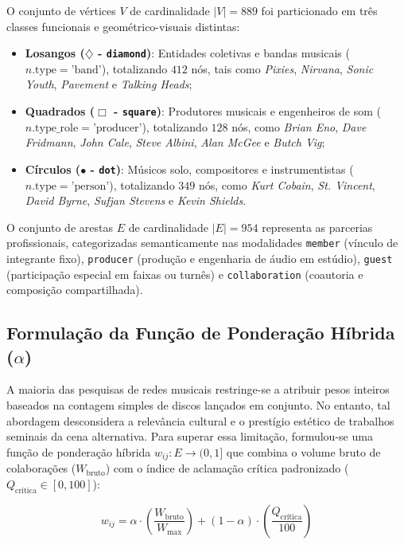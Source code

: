 \documentclass[conference]{IEEEtran}
\begin{document}
O conjunto de vértices $V$ de cardinalidade $|V|=889$ foi particionado em três classes funcionais e geométrico-visuais distintas:
\begin{itemize}
    \item \textbf{Losangos ($\diamondsuit$ - \texttt{diamond})}: Entidades coletivas e bandas musicais ($n.\text{type} = \text{'band'}$), totalizando $412$ nós, tais como \textit{Pixies}, \textit{Nirvana}, \textit{Sonic Youth}, \textit{Pavement} e \textit{Talking Heads};
    \item \textbf{Quadrados ($\Box$ - \texttt{square})}: Produtores musicais e engenheiros de som ($n.\text{type\_role} = \text{'producer'}$), totalizando $128$ nós, como \textit{Brian Eno}, \textit{Dave Fridmann}, \textit{John Cale}, \textit{Steve Albini}, \textit{Alan McGee} e \textit{Butch Vig};
    \item \textbf{Círculos ($\bullet$ - \texttt{dot})}: Músicos solo, compositores e instrumentistas ($n.\text{type} = \text{'person'}$), totalizando $349$ nós, como \textit{Kurt Cobain}, \textit{St. Vincent}, \textit{David Byrne}, \textit{Sufjan Stevens} e \textit{Kevin Shields}.
\end{itemize}

O conjunto de arestas $E$ de cardinalidade $|E|=954$ representa as parcerias profissionais, categorizadas semanticamente nas modalidades \texttt{member} (vínculo de integrante fixo), \texttt{producer} (produção e engenharia de áudio em estúdio), \texttt{guest} (participação especial em faixas ou turnês) e \texttt{collaboration} (coautoria e composição compartilhada).

\subsection{Formulação da Função de Ponderação Híbrida ($\alpha$)}
A maioria das pesquisas de redes musicais restringe-se a atribuir pesos inteiros baseados na contagem simples de discos lançados em conjunto. No entanto, tal abordagem desconsidera a relevância cultural e o prestígio estético de trabalhos seminais da cena alternativa. Para superar essa limitação, formulou-se uma função de ponderação híbrida $w_{ij}: E \to (0, 1]$ que combina o volume bruto de colaborações ($W_{\text{bruto}}$) com o índice de aclamação crítica padronizado ($Q_{\text{crítica}} \in [0, 100]$):

\begin{equation}
w_{ij} = \alpha \cdot \left(\frac{W_{\text{bruto}}}{W_{\max}}\right) + (1 - \alpha) \cdot \left(\frac{Q_{\text{crítica}}}{100}\right)
\end{equation}
\end{document}
